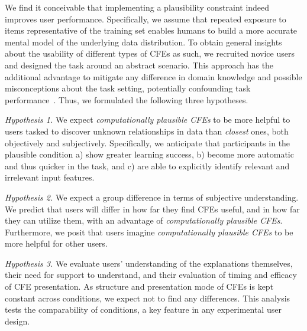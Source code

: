 We find it conceivable that implementing a plausibility constraint indeed improves user performance. 
Specifically, we assume that repeated exposure to items representative of the training set enables humans to build a more accurate mental model of the underlying data distribution.
To obtain general insights about the usability of different types of \glspl{CFE} as such, we recruited novice users and designed the task around an abstract scenario.
This approach has the additional advantage to mitigate any difference in domain knowledge and possible misconceptions about the task setting, potentially confounding task performance~\citep{van_der_waa_evaluating_2021}.
Thus, we formulated the following three hypotheses.

\textit{Hypothesis 1.} We expect \textit{computationally plausible \glspl{CFE}} to be more helpful to users tasked to discover unknown relationships in data than \textit{closest} ones, both objectively and subjectively. 
Specifically, we anticipate that participants in the plausible condition a) show greater learning success, b) become more automatic and thus quicker in the task, and c) are able to explicitly identify relevant and irrelevant input features.

\textit{Hypothesis 2.} We expect a group difference in terms of subjective understanding.
We predict that users will differ in how far they find \glspl{CFE} useful, and in how far they can utilize them, with an advantage of \textit{computationally plausible \glspl{CFE}}. %
Furthermore, we posit that users imagine \textit{computationally plausible \glspl{CFE}} to be more helpful for other users. %

\textit{Hypothesis 3.} We evaluate users' understanding of the explanations themselves, their need for support to understand, and their evaluation of timing and efficacy of \gls{CFE} presentation. As structure and presentation mode of \glspl{CFE} is kept constant across conditions, we expect not to find any differences.
This analysis tests the comparability of conditions, a key feature in any experimental user design.

